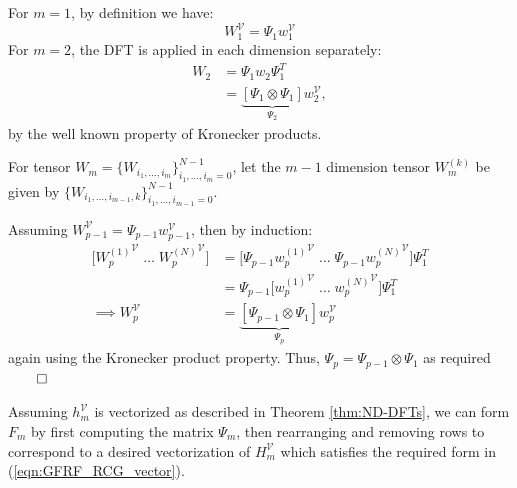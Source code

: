 \begin{proof*}
For $m=1$, by definition we have:
\begin{equation}
W_1^{\mathcal{V}} = \Psi_1 w_1^{\mathcal{V}}
\end{equation}
For $m=2$, the DFT is applied in each dimension separately:
\begin{align}
W_2 &= \Psi_1 w_2 \Psi_1^T \\
&= \underbrace{[\Psi_1 \otimes \Psi_1]}_{\Psi_2} w_2^{\mathcal{V}},
\end{align}
by the well known property of Kronecker products. 

For tensor $W_m = \{ W_{i_1,\hdots,i_m} \}_{i_1,\hdots,i_m = 0}^{N-1}$, let the $m-1$ dimension tensor $W_m^{(k)}$ be given by $\{ W_{i_1,\hdots,i_{m-1},k} \}_{i_1,\hdots,i_{m-1} = 0}^{N-1}$. 

Assuming $W_{p-1}^{\mathcal{V}} = \Psi_{p-1} w_{p-1}^{\mathcal{V}}$, then by induction:
\begin{align}
\big[ {W_{p}^{(1)}}^{\mathcal{V}} \; \hdots \; {W_{p}^{(N)}}^{\mathcal{V}} \big]  &= \big[ \Psi_{p-1} {w_{p}^{(1)}}^{\mathcal{V}} \; \hdots \; \Psi_{p-1} {w_{p}^{(N)}}^{\mathcal{V}} \big] \Psi_1^T \\
&= \Psi_{p-1} \big[ {w_{p}^{(1)}}^{\mathcal{V}} \; \hdots \; {w_{p}^{(N)}}^{\mathcal{V}} \big] \Psi_1^T \\
\implies W_{p}^{\mathcal{V}} &= \underbrace{[\Psi_{p-1} \otimes \Psi_1]}_{\Psi_{p}} w_{p}^{\mathcal{V}}
\end{align}
again using the Kronecker product property. Thus, $\Psi_{p} = \Psi_{p-1} \otimes \Psi_1 $ as required \hfill  $\qed$

\end{proof*} 

Assuming $h_m^{\mathcal{V}}$ is vectorized as described in Theorem \ref{thm:ND-DFTs}, we can form $F_m$ by first computing the matrix $\Psi_m$, then rearranging and removing rows to correspond to a desired vectorization of $H_m^{\mathcal{V}}$ which satisfies the required form in (\ref{eqn:GFRF_RCG_vector}).

